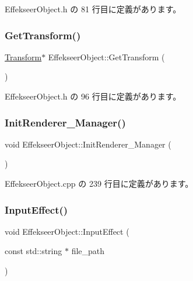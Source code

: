  Effekseer\+Object.\+h の 81 行目に定義があります。

\mbox{\label{class_effekseer_object_ad7e825d08856df48459437ad759d7a00}} 
\subsubsection{\texorpdfstring{Get\+Transform()}{GetTransform()}}
{\footnotesize\ttfamily \mbox{\hyperlink{class_transform}{Transform}}$\ast$ Effekseer\+Object\+::\+Get\+Transform (\begin{DoxyParamCaption}{ }\end{DoxyParamCaption})\hspace{0.3cm}{\ttfamily [inline]}}



 Effekseer\+Object.\+h の 96 行目に定義があります。

\mbox{\label{class_effekseer_object_a4f8e7ad6b6ebfa341302f6b78e846f1e}} 
\subsubsection{\texorpdfstring{Init\+Renderer\+\_\+\+Manager()}{InitRenderer\_Manager()}}
{\footnotesize\ttfamily void Effekseer\+Object\+::\+Init\+Renderer\+\_\+\+Manager (\begin{DoxyParamCaption}{ }\end{DoxyParamCaption})\hspace{0.3cm}{\ttfamily [private]}}



 Effekseer\+Object.\+cpp の 239 行目に定義があります。

\mbox{\label{class_effekseer_object_a1566339dd4acebff341a867a2fd05c17}} 
\subsubsection{\texorpdfstring{Input\+Effect()}{InputEffect()}}
{\footnotesize\ttfamily void Effekseer\+Object\+::\+Input\+Effect (\begin{DoxyParamCaption}\item[{const std\+::string $\ast$}]{file\+\_\+path }\end{DoxyParamCaption})\hspace{0.3cm}{\ttfamily [private]}}



